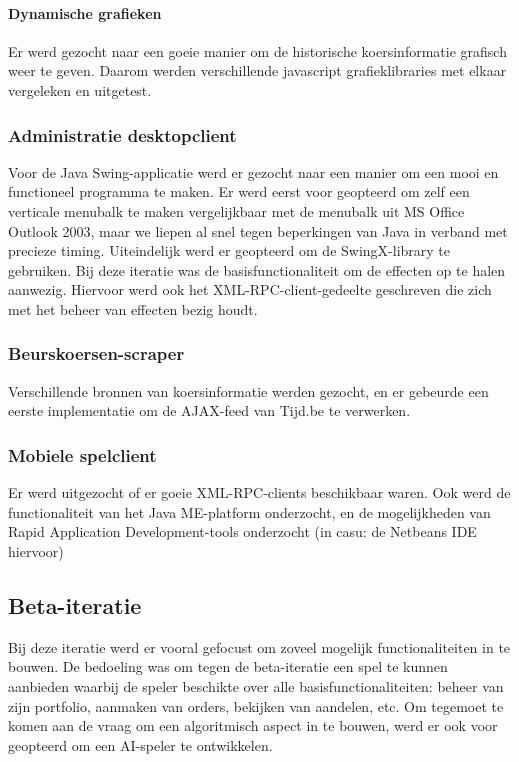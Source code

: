 \paragraph{Dynamische grafieken}
Er werd gezocht naar een goeie manier om de historische koersinformatie grafisch weer te geven. Daarom werden verschillende javascript grafieklibraries met elkaar vergeleken en uitgetest.

\subsubsection{Administratie desktopclient}
Voor de Java Swing-applicatie werd er gezocht naar een manier om een mooi en functioneel programma te maken. Er werd eerst voor geopteerd om zelf een verticale menubalk te maken vergelijkbaar met de menubalk uit MS Office Outlook 2003, maar we liepen al snel tegen beperkingen van Java in verband met precieze timing. Uiteindelijk werd er geopteerd om de SwingX-library te gebruiken.
Bij deze iteratie was de basisfunctionaliteit om de effecten op te halen aanwezig. Hiervoor werd ook het XML-RPC-client-gedeelte geschreven die zich met het beheer van effecten bezig houdt.

\subsubsection{Beurskoersen-scraper}
Verschillende bronnen van koersinformatie werden gezocht, en er gebeurde een eerste implementatie om de AJAX-feed van Tijd.be te verwerken.

\subsubsection{Mobiele spelclient}
Er werd uitgezocht of er goeie XML-RPC-clients beschikbaar waren. Ook werd de functionaliteit van het Java ME-platform onderzocht, en de mogelijkheden van Rapid Application Development-tools onderzocht (in casu: de Netbeans IDE hiervoor)


\subsection{Beta-iteratie}
Bij deze iteratie werd er vooral gefocust om zoveel mogelijk functionaliteiten in te bouwen. De bedoeling was om tegen de beta-iteratie een spel te kunnen aanbieden waarbij de speler beschikte over alle basisfunctionaliteiten: beheer van zijn portfolio, aanmaken van orders, bekijken van aandelen, etc.
Om tegemoet te komen aan de vraag om een algoritmisch aspect in te bouwen, werd er ook voor geopteerd om een AI-speler te ontwikkelen.

